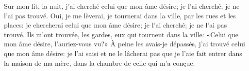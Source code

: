 Sur mon lit, la nuit, j’ai cherché celui que mon âme désire;
	je l’ai cherché; je ne l’ai pas trouvé.
Oui, je me lèverai, je tournerai dans la ville, par les rues et les places:
	je chercherai celui que mon âme désire;
	je l’ai cherché; je ne l’ai pas trouvé.
Ils m’ont trouvée, les gardes, eux qui tournent dans la ville:
	«Celui que mon âme désire, l’auriez-vous vu?»
À peine les avais-je dépassés, j’ai trouvé celui que mon âme désire:
	je l’ai saisi et ne le lâcherai pas
		que je l’aie fait entrer dans la maison de ma mère,
	dans la chambre de celle qui m’a conçue.
